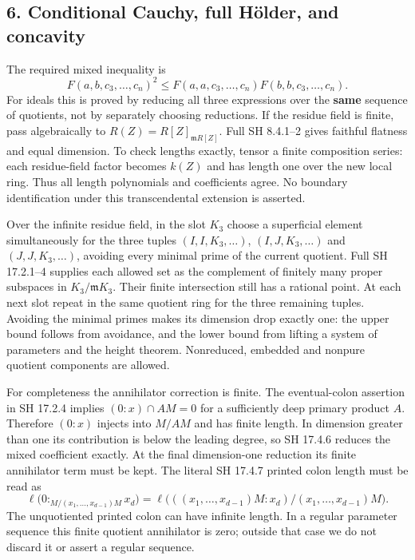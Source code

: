 \documentclass[
]{article}
\begin{document}
\subsection{6. Conditional Cauchy, full Hölder, and
concavity}\label{conditional-cauchy-full-huxf6lder-and-concavity}

The required mixed inequality is
\[F(a,b,c_3,\ldots,c_n)^2\le F(a,a,c_3,\ldots,c_n)F(b,b,c_3,\ldots,c_n).\tag{6.1}\]
For ideals this is proved by reducing all three expressions over the
\textbf{same} sequence of quotients, not by separately choosing
reductions. If the residue field is finite, pass algebraically to
\(R(Z)=R[Z]_{\mathfrak mR[Z]}\). Full SH 8.4.1--2 gives faithful
flatness and equal dimension. To check lengths exactly, tensor a finite
composition series: each residue-field factor becomes \(k(Z)\) and has
length one over the new local ring. Thus all length polynomials and
coefficients agree. No boundary identification under this transcendental
extension is asserted.

Over the infinite residue field, in the slot \(K_3\) choose a
superficial element simultaneously for the three tuples
\((I,I,K_3,\ldots)\), \((I,J,K_3,\ldots)\) and \((J,J,K_3,\ldots)\),
avoiding every minimal prime of the current quotient. Full SH 17.2.1--4
supplies each allowed set as the complement of finitely many proper
subspaces in \(K_3/\mathfrak mK_3\). Their finite intersection still has
a rational point. At each next slot repeat in the same quotient ring for
the three remaining tuples. Avoiding the minimal primes makes its
dimension drop exactly one: the upper bound follows from avoidance, and
the lower bound from lifting a system of parameters and the height
theorem. Nonreduced, embedded and nonpure quotient components are
allowed.

For completeness the annihilator correction is finite. The
eventual-colon assertion in SH 17.2.4 implies \((0:x)\cap AM=0\) for a
sufficiently deep primary product \(A\). Therefore \((0:x)\) injects
into \(M/AM\) and has finite length. In dimension greater than one its
contribution is below the leading degree, so SH 17.4.6 reduces the mixed
coefficient exactly. At the final dimension-one reduction its finite
annihilator term must be kept. The literal SH 17.4.7 printed colon
length must be read as \[\ell\big(0:_{M/(x_1,\ldots,x_{d-1})M}x_d\big)
=\ell\big(((x_1,\ldots,x_{d-1})M:x_d)/(x_1,\ldots,x_{d-1})M\big).\] The
unquotiented printed colon can have infinite length. In a regular
parameter sequence this finite quotient annihilator is zero; outside
that case we do not discard it or assert a regular sequence.
\end{document}
